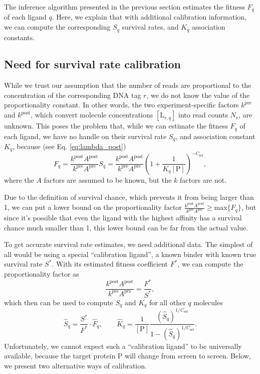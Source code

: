 \documentclass[letter,10pt,oneside]{article}
\newcommand{\bel}{\begin{equation}}
\newcommand{\eel}{\end{equation}}
\newcommand{\+}{^\dagger}
\newcommand{\refeq}[1]{Eq. \ref{#1}}
\begin{document}
The inference algorithm presented in the previous section estimates the fitness $F_q$ of each ligand $q$. Here, we explain that with additional calibration information, we can compute the corresponding $S_q$ survival rates, and $K_q$ association constants.

\subsection{Need for survival rate calibration}

While we trust our assumption that the number of reads are proportional to the concentration of the corresponding DNA tag $r$, we do not know the value of the proportionality constant. In other words, the two experiment-specific factors $k^\text{pre}$ and $k^\text{post}$, which convert molecule concentrations $[\text{L}_{r,q}]$ into read counts $N_r$, are unknown. This poses the problem that, while we can estimate the fitness $F_q$ of each ligand, we have no handle on their survival rate $S_q$, and association constant $K_q$, because (see \refeq{eq:lambda_post})
\bel
  F_q = \frac{k^\text{post}A^\text{post}}{k^\text{pre}A^\text{pre}} S_q = \frac{k^\text{post}A^\text{post}}{k^\text{pre}A^\text{pre}} \left(1 + \frac{1}{K_q[\text{P}]}\right)^{-C_\text{sel}},
\eel
where the $A$ factors are assumed to be known, but the $k$ factors are not.

Due to the definition of survival chance, which prevents it from being larger than 1, we can put a lower bound on the proportionality factor $\frac{k^\text{post} A^\text{post}}{k^\text{pre} A^\text{pre}} \geq \text{max}\{F_q\}$, but since it's possible that even the ligand with the highest affinity has a survival chance much smaller than 1, this lower bound can be far from the actual value.

To get accurate survival rate estimates, we need additional data. The simplest of all would be using a special ``calibration ligand'', a known binder with known true survival rate $S^\ast$. With its estimated fitness coefficient $F^\ast$, we can compute the proportionality factor as
\bel
  \frac{k^\text{post}A^\text{post}}{k^\text{pre}A^\text{pre}} = \frac{F^\ast}{S^\ast},
\eel
which then can be used to compute $S_q$ and $K_q$ for all other $q$ molecules
\bel
  \hat S_q = \frac{S^\ast}{F^\ast}\cdot \hat F_q,\qquad \hat K_q = \frac{1}{[\text{P}]}\frac{(\hat S_q)^{1/C_\text{sel}}}{1 - (\hat S_q)^{1/C_\text{sel}}}.
\eel
Unfortunately, we cannot expect such a ``calibration ligand'' to be universally available, because the target protein P will change from screen to screen. Below, we present two alternative ways of calibration.
\end{document}
